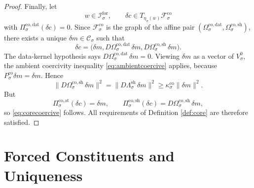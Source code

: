 \documentclass[11pt]{article}
\newcommand{\ForSpace}[1]{\mathcal I_{#1}^{\mathrm{for}}}
\newcommand{\BalShell}[1]{\Lambda_{#1}^{\mathrm{sh}}}
\newcommand{\ZeroHiddenVec}[1]{V_{#1}^{0}}
\newcommand{\StateComp}[1]{P_{#1}^{\mathrm{co}}}
\newcommand{\CoreState}[1]{\mathcal C_{#1}}
\newcommand{\CoreAffine}[1]{\mathcal F_{#1}^{\mathrm{co}}}
\newcommand{\CoreStateProj}[1]{\Pi_{#1}^{\mathrm{co,st}}}
\newcommand{\CoreDataProj}[1]{\Pi_{#1}^{\mathrm{co,dat}}}
\newcommand{\CoreShellProj}[1]{\Pi_{#1}^{\mathrm{co,sh}}}
\newcommand{\CoreDataMap}[1]{\Omega_{#1}^{\mathrm{co,dat}}}
\newcommand{\CoreShellMap}[1]{\Omega_{#1}^{\mathrm{co,sh}}}
\newcommand{\CoreEmbed}[1]{\eta_{#1}}
\begin{document}
\begin{proof}
Finally, let
\[
w\in\ForSpace{\sigma},
\qquad
\delta c\in T_{\CoreEmbed{\sigma}(w)}\CoreAffine{\sigma}
\]
with \(\CoreDataProj{\sigma}(\delta c)=0\). Since \(\CoreAffine{\sigma}\) is the graph of the affine pair \((\CoreDataMap{\sigma},\CoreShellMap{\sigma})\), there exists a unique \(\delta m\in\CoreState{\sigma}\) such that
\[
\delta c=
\bigl(
\delta m,
D\CoreDataMap{\sigma}\,\delta m,
D\CoreShellMap{\sigma}\,\delta m
\bigr).
\]
The data-kernel hypothesis says \(D\CoreDataMap{\sigma}\,\delta m=0\). Viewing \(\delta m\) as a vector of \(\ZeroHiddenVec{\sigma}\), the ambient coercivity inequality \eqref{eq:ambientcoercive} applies, because \(\StateComp{\sigma}\delta m=\delta m\). Hence
\[
\|D\CoreShellMap{\sigma}\,\delta m\|^{2}
=
\|D\BalShell{\sigma}\,\delta m\|^{2}
\ge
\kappa_{\sigma}^{\mathrm{co}}\|\delta m\|^{2}.
\]
But
\[
\CoreStateProj{\sigma}(\delta c)=\delta m,
\qquad
\CoreShellProj{\sigma}(\delta c)=D\CoreShellMap{\sigma}\,\delta m,
\]
so \eqref{eq:corecoercive} follows. All requirements of Definition \ref{def:core} are therefore satisfied.
\end{proof}

\section{Forced Constituents and Uniqueness}
\end{document}
